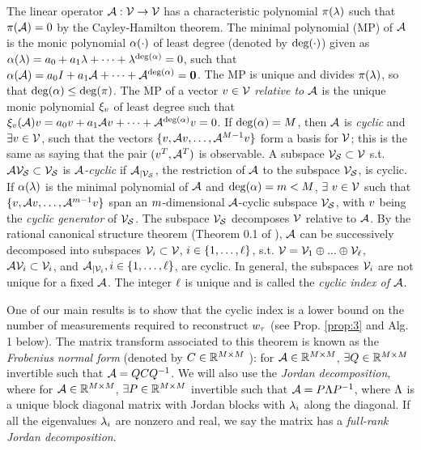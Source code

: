 The linear operator $\mathcal{A}:\mathcal{V}\rightarrow\mathcal{V}$ has a characteristic polynomial $\pi(\lambda) $ such that $\pi(\mathcal{A})=0 $ by the Cayley-Hamilton theorem. The minimal polynomial (MP) of $\mathcal{A}$ is the monic polynomial $\alpha(\cdot)$ of least degree (denoted by $\operatorname{deg}(\cdot)$) given as 
$\alpha(\lambda) = a_0 + a_1\lambda +\cdots + \lambda^{\operatorname{deg}(\alpha)} = 0$, such that
$\alpha(\mathcal{A})=a_0 I + a_1\mathcal{A} +\cdots + \mathcal{A}^{\operatorname{deg}(\alpha)} = \bm{0}$. 
The MP is unique and divides $\pi(\lambda)$, so that $ \operatorname{deg}(\alpha) \leq \operatorname{deg}(\pi)$. The MP of a vector $v\in\mathcal{V}$ \emph{relative to $\mathcal{A}$} is the unique monic polynomial $\xi_{v}$ of least degree such that 
$\xi_{v}(\mathcal{A})v= a_0v + a_1\mathcal{A}v + \cdots + \mathcal{A}^{\operatorname{deg}(\alpha)}v = 0$. 
If $\operatorname{deg}(\alpha) = M$, then $\mathcal{A}$ is \emph{cyclic} and $\exists v\in \mathcal{V}$, such that the vectors $\{v, \mathcal{A} v,\dots,\mathcal{A}^{M-1}v\}$ form a basis for $\mathcal{V}$; this is the same as saying that the pair $(v^T,\mathcal{A}^T)$ is observable.    
A subspace $\mathcal{V}_{\mathcal{S}}\subset\mathcal{V}$ s.t. $\mathcal{A}\mathcal{V}_{\mathcal{S}}\subset\mathcal{V}_{\mathcal{S}}$ is \emph{$\mathcal{A}$-cyclic} if  ${\mathcal{A}}_{|\mathcal{V}_{\mathcal{S}}}$, the restriction of $\mathcal{A}$ to the subspace $\mathcal{V}_{\mathcal{S}}$, is cyclic. If $\alpha(\lambda)$ is the minimal polynomial of $\mathcal{A}$ and $\operatorname{deg}(\alpha) = m < M$, $\exists~v\in\mathcal{V}$ such that $\{v, \mathcal{A} v,\dots,\mathcal{A}^{m-1}v\}$ span an $m$-dimensional $\mathcal{A}$-cyclic subspace $\mathcal{V}_{\mathcal{S}}$, with $v$ being the \emph{cyclic generator} of $\mathcal{V}_{\mathcal{S}}$.  The subspace $\mathcal{V}_{\mathcal{S}}$ decomposes $\mathcal{V}$ relative to $\mathcal{A}$. By the rational canonical structure theorem (Theorem 0.1 of \cite{wonham1974linear}), $\mathcal{A}$ can be successively decomposed into subspaces $\mathcal{V}_i \subset \mathcal{V}$, $i\in \{1,\dots,\ell\}$, s.t. $\mathcal{V} = \mathcal{V}_1 \oplus ... \oplus \mathcal{V}_{\ell}$, $\mathcal{A}\mathcal{V}_i \subset \mathcal{V}_i$, and  $\mathcal{A}_{|\mathcal{V}_i}, i \in \{1,\dots,\ell\}$, are cyclic. In general, the subspaces $\mathcal{V}_i$ are not unique for a fixed $\mathcal{A}$. The integer $\ell$ is unique and is called the \emph{cyclic index of $\mathcal{A}$}. 

One of our main results is to show that the cyclic index is a lower bound on the number of measurements required to reconstruct $w_{\tau}$ (see Prop. \ref{prop:3} and Alg. 1 below). The matrix transform associated to this theorem is known as the \emph{Frobenius normal form} (denoted by $C\in\mathbb{R}^{M\times M}$ ): for $\mathcal{A}\in\mathbb{R}^{M\times M}$,  $\exists Q\in\mathbb{R}^{M\times M}$ invertible  such that $\mathcal{A} = QCQ^{-1}$. We will also use the \emph{Jordan decomposition}, where for $\mathcal{A}\in\mathbb{R}^{M\times M}$, $\exists P\in\mathbb{R}^{M\times M}$ invertible such that $\mathcal{A} = P\Lambda P^{-1}$, where $\Lambda$ is a unique block diagonal matrix with Jordan blocks with $\lambda_i$ along the diagonal. 
If all the eigenvalues $\lambda_i$ are nonzero and real, we say the matrix has a \emph{full-rank Jordan decomposition}. 

